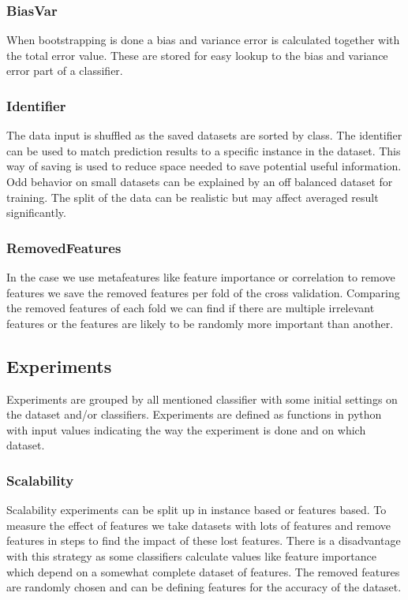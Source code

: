 \documentclass[a4paper,10pt]{article}
\begin{document}
\subsubsection{BiasVar}
When bootstrapping is done a bias and variance error is calculated together with the total error value. These are stored for easy lookup to the bias and variance error part of a classifier.

\subsubsection{Identifier}
The data input is shuffled as the saved datasets are sorted by class. The identifier can be used to match prediction results to a specific instance in the dataset. This way of saving is used to reduce space needed to save potential useful information. Odd behavior on small datasets can be explained by an off balanced dataset for training. The split of the data can be realistic but may affect averaged result significantly. 

\subsubsection{RemovedFeatures}
In the case we use metafeatures like feature importance or correlation to remove features we save the removed features per fold of the cross validation. Comparing the removed features of each fold we can find if there are multiple irrelevant features or the features are likely to be randomly more important than another.

\subsection{Experiments}
Experiments are grouped by all mentioned classifier with some initial settings on the dataset and/or classifiers. Experiments are defined as functions in python with input values indicating the way the experiment is done and on which dataset.
\subsubsection{Scalability}
Scalability experiments can be split up in instance based or features based. To measure the effect of features we take datasets with lots of features and remove features in steps to find the impact of these lost features. There is a disadvantage with this strategy as some classifiers calculate values like feature importance which depend on a somewhat complete dataset of features. The removed features are randomly chosen and can be defining features for the accuracy of the dataset. 
\end{document}
